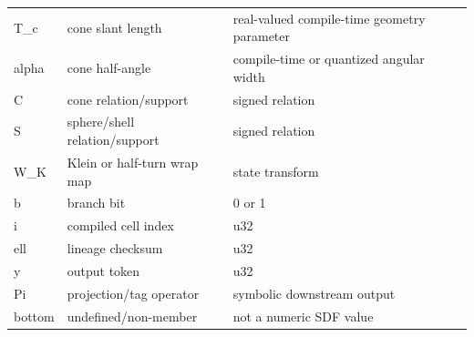 \begin{longtable}{@{}L{0.16\textwidth}L{0.39\textwidth}L{0.39\textwidth}@{}}
T\_c & cone slant length & real-valued compile-time geometry parameter \\
alpha & cone half-angle & compile-time or quantized angular width \\
C & cone relation/\allowbreak{}support & signed relation \\
S & sphere/\allowbreak{}shell relation/\allowbreak{}support & signed relation \\
W\_K & Klein or half-turn wrap map & state transform \\
b & branch bit & 0 or 1 \\
i & compiled cell index & u32 \\
ell & lineage checksum & u32 \\
y & output token & u32 \\
Pi & projection/\allowbreak{}tag operator & symbolic downstream output \\
bottom & undefined/\allowbreak{}non-member & not a numeric SDF value \\
\end{longtable}
\normalsize
\endgroup
